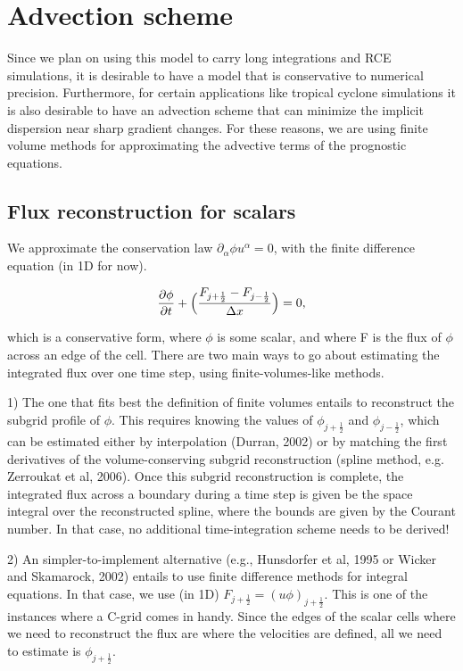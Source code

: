 \documentclass[11pt]{article}
\begin{document}
\section{Advection scheme}

Since we plan on using this model to carry long integrations and RCE simulations, it is desirable to have a model that is conservative to numerical precision. Furthermore, for certain applications like tropical cyclone simulations it is also desirable to have an advection scheme that can minimize the implicit dispersion near sharp gradient changes. For these reasons, we are using finite volume methods for approximating the advective terms of the prognostic equations.

\subsection{Flux reconstruction for scalars}

We approximate the conservation law $\partial_\alpha \phi u^{\alpha} = 0$, with the finite difference equation (in 1D for now).

\begin{equation}
\pdv{\phi}{t} + \Big(\frac{F_{j+\frac{1}{2}}-F_{j-\frac{1}{2}}}{\Delta x}\Big) = 0,
\end{equation}

which is a conservative form, where $\phi$ is some scalar, and where F is the flux of $\phi$ across an edge of the cell. There are two main ways to go about estimating the integrated flux over one time step, using finite-volumes-like methods.

1) The one that fits best the definition of finite volumes entails to reconstruct the subgrid profile of $\phi$. This requires knowing the values of $\phi_{j+\frac{1}{2}}$ and $\phi_{j-\frac{1}{2}}$, which can be estimated either by interpolation (Durran, 2002) or by matching the first derivatives of the volume-conserving subgrid reconstruction (spline method, e.g. Zerroukat et al, 2006). Once this subgrid reconstruction is complete, the integrated flux across a boundary during a time step is given be the space integral over the reconstructed spline, where the bounds are given by the Courant number. In that case, no additional time-integration scheme needs to be derived!

2) An simpler-to-implement alternative (e.g., Hunsdorfer et al, 1995 or Wicker and Skamarock, 2002) entails to use finite difference methods for integral equations. In that case, we use (in 1D) $F_{j+\frac{1}{2}} = (u\phi)_{j+\frac{1}{2}}$. This is one of the instances where a C-grid comes in handy. Since the edges of the scalar cells where we need to reconstruct the flux are where the velocities are defined, all we need to estimate is $\phi_{j+\frac{1}{2}}$.
\end{document}
